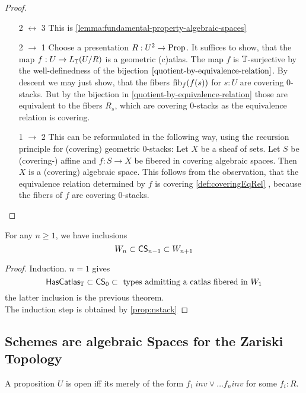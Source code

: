 \begin{proof}
\ 	\begin{enumerate}
	\item [2 $\leftrightarrow$ 3]
		This is \ref {lemma:fundamental-property-algebraic-spaces}
	\item [2 $\to$ 1]
	Choose a presentation $ R: U^2 \to \operatorname{Prop}$.
	It suffices to show, that the map $f : U \to L_{\mathbb{T}} ( U / R)$ is a geometric (c)atlas. The map $f$ is $\mathbb{T}$-surjective by the well-definedness of the bijection $\ref{quotient-by-equivalence-relation}$. By descent we may just show, that the fibers $\operatorname{fib}_f (f(s))$ for $s : U$ are covering 0-stacks. But by the bijection in \ref{quotient-by-equivalence-relation} those are equivalent to the fibers $R_s$, which are covering 0-stacks as the equivalence relation is covering. \\
	\item [1 $\to$ 2]
	This can be reformulated in the following way, using the recursion principle for (covering) geometric 0-stacks:
	Let $X$ be a sheaf of sets. Let $S$ be (covering-) affine and $f : S \to X$ be fibered in covering algebraic spaces. Then $X$ is a (covering) algebraic space.
This follows from the observation, that the equivalence relation determined by $f$ is covering \ref{def:coveringEqRel} , because the fibers of $f$ are covering 0-stacks.
	\end{enumerate}
\end{proof}
\begin{prop}
	For any $n \ge 1$, we have inclusions 
	\[W_{n} \subset \mathsf{CS}_{n-1} \subset W_{n+1}\]
\end{prop}
\begin{proof}
	Induction. $n = 1$ gives
	\[
	\mathsf{HasCatlas}_{\mathbb{T}} \subset \mathsf{CS}_0 \subset \text{ types admitting a catlas fibered in } W_1
	\]
	the latter inclusion is the previous theorem. \\
	The induction step is obtained by \ref{prop:nstack}
\end{proof}


\subsection{Schemes are algebraic Spaces for the Zariski Topology}
\begin{definition}
 A proposition $U$ is open iff its merely of the form $f_1 \ inv \lor \hdots f_n inv$ for some $f_i : R$.
\end{definition}

